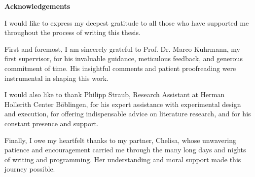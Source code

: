 
\clearemptydoublepage
{}

\vspace*{2cm}
{\Large \bf Acknowledgements}

\vspace{1cm}

I would like to express my deepest gratitude to all those who have supported me throughout the process of writing this thesis.

First and foremost, I am sincerely grateful to Prof. Dr. Marco Kuhrmann, my first supervisor, for his invaluable guidance, meticulous feedback, and generous commitment of time. His insightful comments and patient proofreading were instrumental in shaping this work.

I would also like to thank Philipp Straub, Research Assistant at Herman Hollerith Center Böblingen, for his expert assistance with experimental design and execution, for offering indispensable advice on literature research, and for his constant presence and support.

Finally, I owe my heartfelt thanks to my partner, Chelisa, whose unwavering patience and encouragement carried me through the many long days and nights of writing and programming. Her understanding and moral support made this journey possible.